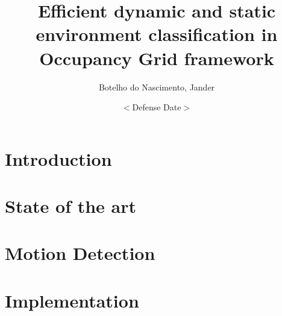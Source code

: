 \documentclass[12pt, a4paper]{memoir} %
\title{Efficient dynamic and static environment classification in Occupancy Grid framework}%
\author{Botelho do Nascimento, Jander}
\date{ $<$Defense Date$>$} %
\begin{document}
\frontmatter
\begin{titlingpage}
\maketitle
\end{titlingpage}

\setlength{\parskip}{-1pt plus 1pt}

\renewcommand{\abstracttextfont}{\normalfont}
\abstractintoc
\begin{abstract} 

\end{abstract}

\cleardoublepage

\tableofcontents* 

\normalsize

\mainmatter
\SingleSpace

\chapter{Introduction} 
	

	
\chapter{State of the art}
	


\chapter{Motion Detection}
	


\chapter{Implementation}
	
	

\backmatter


{}
\end{document}

